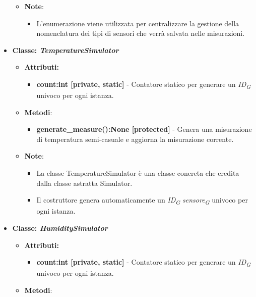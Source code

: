\begin{itemize}
\begin{itemize}
            \item \textbf{Note}:
            \begin{itemize}
                \item L'enumerazione viene utilizzata per centralizzare la gestione della nomenclatura dei tipi di sensori che verrà salvata nelle misurazioni.
            \end{itemize}
        \end{itemize}
        
        
    \item{\textbf{Classe: \textit{TemperatureSimulator}}}
    \begin{itemize}
        \item \textbf{Attributi:}
    \begin{itemize}
        \item \textbf{count:int [private, static]} - Contatore statico per generare un \textit{ID}\textsubscript{\textit{G}} univoco per ogni istanza.
    \end{itemize}
    \item\textbf{Metodi}: 
    \begin{itemize}
        \item \textbf{generate\_measure():None [protected]} - Genera una misurazione di temperatura semi-casuale e aggiorna la misurazione corrente.
    \end{itemize}
    \item\textbf{Note}:
    \begin{itemize}
        \item La classe TemperatureSimulator è una classe concreta che eredita dalla classe astratta Simulator.
        \item Il costruttore genera automaticamente un \textit{ID}\textsubscript{\textit{G}} \textit{sensore}\textsubscript{\textit{G}} univoco per ogni istanza.
    \end{itemize}
\end{itemize}
    \item{\textbf{Classe: \textit{HumiditySimulator}}}
    \begin{itemize}
        \item\textbf{Attributi:}
    \begin{itemize}
        \item \textbf{count:int [private, static]} - Contatore statico per generare un \textit{ID}\textsubscript{\textit{G}} univoco per ogni istanza.
    \end{itemize}
    \item \textbf{Metodi}: 

\end{itemize}
\end{itemize}
